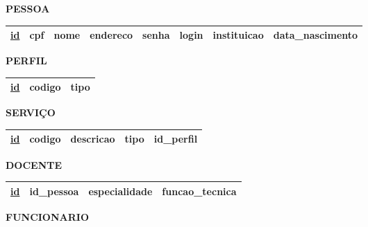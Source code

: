 \documentclass{article}
\begin{document}
\noindent
\textbf{PESSOA}
\vspace{-5pt}

\begin{table}[H]
  \renewcommand{\arraystretch}{1.5}
  \begin{tabular}{|c|c|c|c|c|c|c|c|}
    \hline
    \underline{id} &
    cpf &
    nome & 
    endereco &
    senha &
    login &
    instituicao &
    data\_nascimento \\
    \hline
  \end{tabular}
\end{table}

\noindent
\textbf{PERFIL}
\vspace{-5pt}

\begin{table}[H]
  \renewcommand{\arraystretch}{1.5}
  \begin{tabular}{|c|c|c|}
    \hline
    
    \underline{id} &
    codigo &
    tipo  \\
    \hline
  \end{tabular}
\end{table}

\noindent
\textbf{SERVIÇO}
\vspace{-5pt}

\begin{table}[H]
  \renewcommand{\arraystretch}{1.5}
  \begin{tabular}{|c|c|c|c|c|}
    \hline
    \underline{id} &
    codigo &
    descricao &
    tipo &
    id\_perfil \\
    \hline
  \end{tabular}
\end{table}

\noindent
\textbf{DOCENTE}
\vspace{-5pt}

\begin{table}[H]
  \renewcommand{\arraystretch}{1.5}
  \begin{tabular}{|c|c|c|c|}
    \hline
    \underline{id} &
    id\_pessoa &
    especialidade &
    funcao\_tecnica \\
    \hline
  \end{tabular}
\end{table}

\noindent
\textbf{FUNCIONARIO}
\vspace{-5pt}
\end{document}
